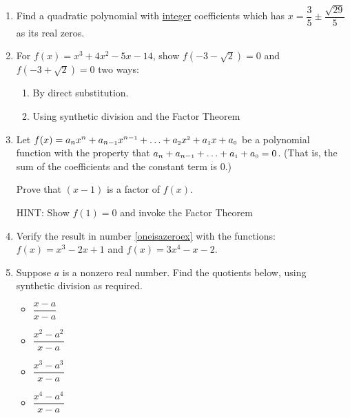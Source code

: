 \documentclass{ximera}
\begin{document}
\begin{enumerate}
\setcounter{enumi}{\value{HW}}

\item Find a quadratic polynomial with \underline{integer} coefficients which has $x = \dfrac{3}{5} \pm \dfrac{\sqrt{29}}{5}$ as its real zeros.

\item  \label{verifyrootsex}  For $f(x) = x^3 + 4x^2-5x-14$, show $f(-3-\sqrt{2}) = 0$ and $f(-3+\sqrt{2}) = 0$ two ways:

\begin{enumerate}

\item  By direct substitution.

\item  Using synthetic division and the Factor Theorem

\end{enumerate}

\item  \label{oneisazeroex} Let $f(x) = a_{n} x^{n} + a_{n-\mbox{\tiny$1$}} x^{n-\mbox{\tiny$1$}} + \ldots + a_{\mbox{\tiny $2$}} x^{\mbox{\tiny $2$}} + a_{\mbox{\tiny $1$}} x + a_{\mbox{\tiny $0$}}$ be a polynomial function with the property that $ a_{n}+a_{n-\mbox{\tiny$1$}} + \ldots + a_{\mbox{\tiny $1$}} + a_{\mbox{\tiny $0$}} = 0$.  (That is, the sum of the coefficients and the constant term is $0$.)  

Prove that $(x-1)$ is a factor of $f(x)$.

HINT:  Show $f(1) = 0$ and invoke the Factor Theorem

\item  Verify the result in number \ref{oneisazeroex} with the functions: $f(x) = x^3 - 2x + 1$ and  $f(x) = 3x^4-x-2$.

\item  \label{monomialdiffquotex} Suppose $a$ is a nonzero real number.  Find the quotients below, using synthetic division as required. 

\begin{multicols}{5}
\begin{itemize}

\item $\dfrac{x - a}{x-a}$ 

\item $\dfrac{x^2 - a^2}{x-a}$ 

\item $\dfrac{x^3 - a^3}{x-a}$ 

\item $\dfrac{x^4 - a^4}{x-a}$ 


\end{itemize}
\end{multicols}
\end{enumerate}
\end{document}

